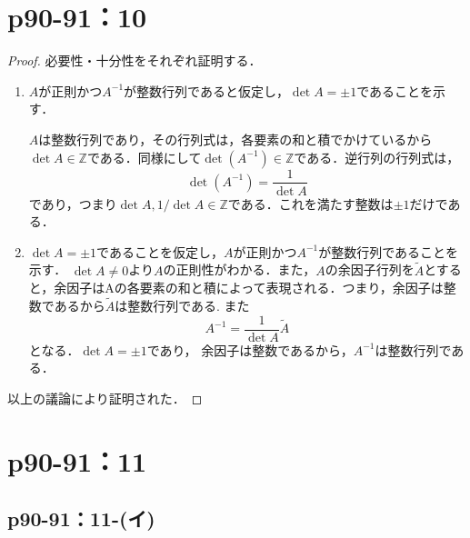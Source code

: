 \documentclass[a4paper,10pt,fleqn]{ltjsarticle}
\begin{document}
\section*{p90-91：10}

\begin{leftbar}
    \begin{proof}
        必要性・十分性をそれぞれ証明する．
        \begin{enumerate}
            \item $A$が正則かつ$A^{-1}$が整数行列であると仮定し，$\det A=\pm 1$であることを示す．

                  $A$は整数行列であり，その行列式は，各要素の和と積でかけているから$\det A \in \mathbb{Z}$である．同様にして$\det (A^{-1}) \in \mathbb{Z}$である．逆行列の行列式は，
                  \[
                      \det (A^{-1})=\frac{1}{\det A}
                  \]
                  であり，つまり$\det A,1/\det A \in \mathbb{Z}$である．これを満たす整数は$\pm 1$だけである．
            \item $\det A=\pm 1$であることを仮定し，$A$が正則かつ$A^{-1}$が整数行列であることを示す．
                  $\det A \neq 0$より$A$の正則性がわかる．また，$A$の余因子行列を$\tilde{A}$とすると，余因子はAの各要素の和と積によって表現される．つまり，余因子は整数であるから$\tilde{A}$は整数行列である. また
                  \[
                      A^{-1}=\frac{1}{\det A}\tilde{A}
                  \]
                  となる．$\det A=\pm 1$であり， 余因子は整数であるから，$A^{-1}$は整数行列である．
        \end{enumerate}
        以上の議論により証明された．
    \end{proof}
\end{leftbar}

\newpage

\section*{p90-91：11}

\subsection*{p90-91：11-(イ)}
\end{document}
